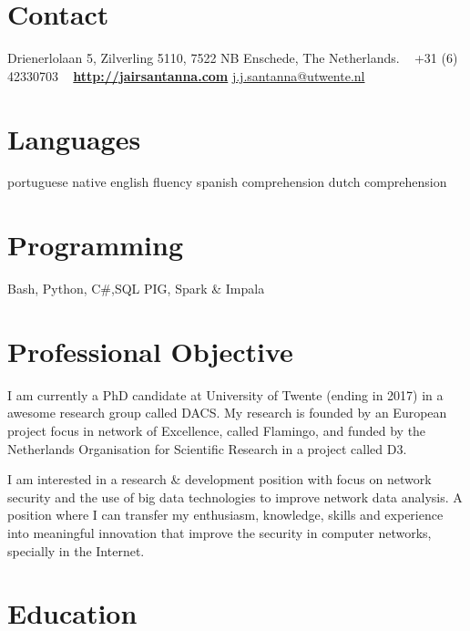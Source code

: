 \documentclass[print]{friggeri-cv} %
\begin{document}

\begin{aside} %
\section{Contact}
Drienerlolaan 5,
Zilverling 5110,
7522 NB Enschede,
The Netherlands.
~
+31 (6) 42330703
~
\href{http://jairsantanna.com}{\textbf{http://jairsantanna.com}}
\href{mailto:j.j.santanna@utwente.nl}{j.j.santanna@utwente.nl}
\section{Languages}
portuguese native 
english fluency
spanish comprehension
dutch comprehension
\section{Programming}
Bash, Python, C\#,SQL
PIG, Spark \& Impala
\end{aside}

\section{Professional Objective}
I am currently a PhD candidate at University of Twente (ending in 2017) in a awesome research group called DACS. My research is founded by an European project focus in network of Excellence, called Flamingo, and funded by the Netherlands Organisation for Scientific Research in a project called D3.

I am interested in a research \& development position with focus on network security and the use of big data technologies to improve network data analysis. A position where I can transfer my enthusiasm, knowledge, skills and experience into meaningful innovation that improve the security in computer networks, specially in the Internet. 

\section{Education}
\end{document}
